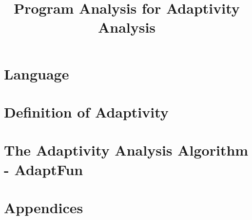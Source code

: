 \documentclass[a4paper,11pt]{article}
\newcommand{\THESYSTEM}{\textsf{AdaptFun}}
\begin{document}
\title{Program Analysis for Adaptivity Analysis}

\author{}

\date{}

\maketitle
%
\tableofcontents


% 
% 

\section{ Language}
\label{sec:language}

\clearpage
\section{Definition of Adaptivity}
\label{sec:adaptivity}

\clearpage
\section{The Adaptivity Analysis Algorithm - {\THESYSTEM}}
\label{sec:algorithm}


% 

% 


% 
% 

%
\clearpage
\appendix
{}
\section*{Appendices}



\end{document}
